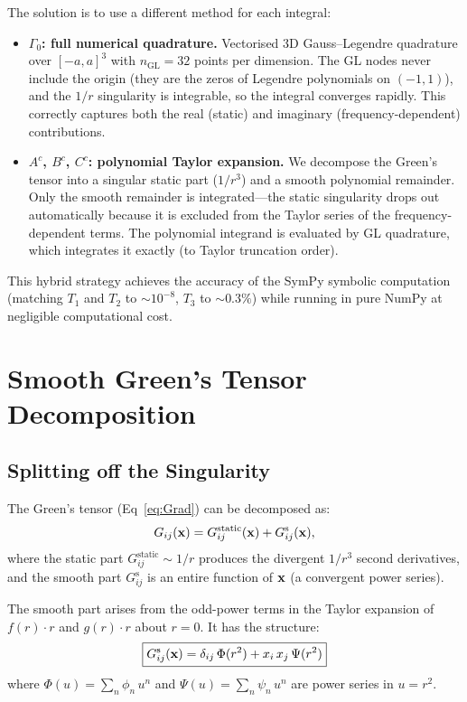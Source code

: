 The solution is to use a different method for each integral:
\begin{itemize}
\item \textbf{$\Gamma_0$: full numerical quadrature.}  Vectorised 3D
  Gauss--Legendre quadrature over $[-a,a]^3$ with $n_{\mathrm{GL}} = 32$
  points per dimension.  The GL nodes never include the origin (they are
  the zeros of Legendre polynomials on $(-1,1)$), and the $1/r$
  singularity is integrable, so the integral converges rapidly.  This
  correctly captures both the real (static) and imaginary
  (frequency-dependent) contributions.

\item \textbf{$A^c$, $B^c$, $C^c$: polynomial Taylor expansion.}  We
  decompose the Green's tensor into a singular static part ($1/r^3$)
  and a smooth polynomial remainder.  Only the smooth remainder is
  integrated---the static singularity drops out automatically because it
  is excluded from the Taylor series of the frequency-dependent terms.
  The polynomial integrand is evaluated by GL quadrature, which
  integrates it exactly (to Taylor truncation order).
\end{itemize}
This hybrid strategy achieves the accuracy of the SymPy symbolic
computation (matching $T_1$ and $T_2$ to $\sim 10^{-8}$, $T_3$ to
$\sim 0.3\%$) while running in pure NumPy at negligible computational
cost.


\section{Smooth Green's Tensor Decomposition}

\subsection{Splitting off the Singularity}

The Green's tensor (Eq~\ref{eq:Grad}) can be decomposed as:
\begin{equation}
  G_{ij}(\mathbf{x})
  = G_{ij}^{\mathrm{static}}(\mathbf{x})
  + G_{ij}^{\mathrm{s}}(\mathbf{x}),
\end{equation}
where the static part $G_{ij}^{\mathrm{static}} \sim 1/r$ produces the
divergent $1/r^3$ second derivatives, and the smooth part
$G_{ij}^{\mathrm{s}}$ is an entire function of $\mathbf{x}$ (a convergent
power series).

The smooth part arises from the odd-power terms in the Taylor expansion of
$f(r)\cdot r$ and $g(r)\cdot r$ about $r=0$.  It has the structure:
\begin{equation}
  \boxed{%
    G_{ij}^{\mathrm{s}}(\bx)
    = \delta_{ij}\,\Phi(r^2) + x_i\,x_j\,\Psi(r^2)
  }
\end{equation}
where $\Phi(u) = \sum_n \phi_n\,u^n$ and $\Psi(u) = \sum_n \psi_n\,u^n$
are power series in $u = r^2$.

